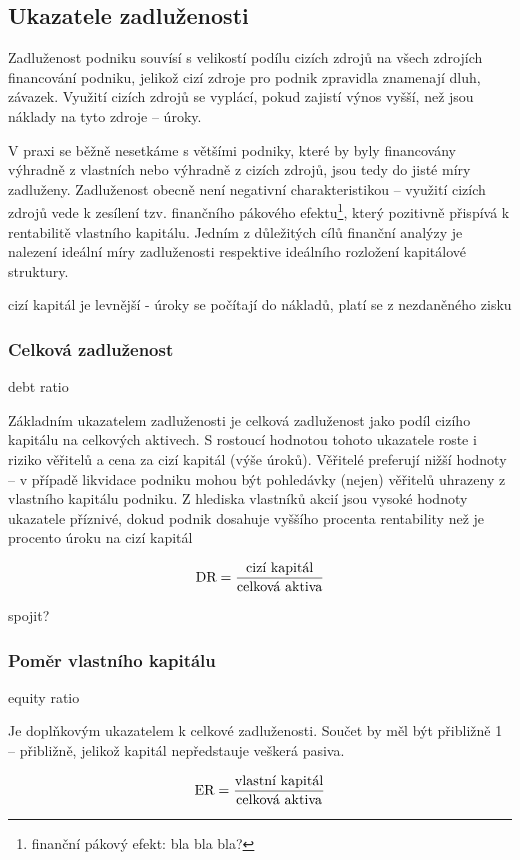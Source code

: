 \subsection{Ukazatele zadluženosti}

Zadluženost podniku souvísí s velikostí podílu cizích zdrojů na všech zdrojích financování podniku, jelikož cizí zdroje pro podnik zpravidla znamenají dluh, závazek. Využití cizích zdrojů se vyplácí, pokud zajistí výnos vyšší, než jsou náklady na tyto zdroje -- úroky. 

V praxi se běžně nesetkáme s většími podniky, které by byly financovány výhradně z vlastních nebo výhradně z cizích zdrojů, jsou tedy do jisté míry zadluženy. Zadluženost obecně není negativní charakteristikou -- využití cizích zdrojů vede k zesílení tzv. finančního pákového efektu\footnote{finanční pákový efekt: bla bla bla?}, který pozitivně přispívá k rentabilitě vlastního kapitálu\cite{kisling}. Jedním z důležitých cílů finanční analýzy je nalezení ideální míry zadluženosti respektive ideálního rozložení kapitálové struktury.

cizí kapitál je levnější - úroky se počítají do nákladů, platí se z nezdaněného zisku

\subsubsection{Celková zadluženost}
debt ratio

Základním ukazatelem zadluženosti je celková zadluženost jako podíl cizího kapitálu na celkových aktivech. S rostoucí hodnotou tohoto ukazatele roste i riziko věřitelů a cena za cizí kapitál (výše úroků). Věřitelé preferují nižší hodnoty -- v případě likvidace podniku mohou být pohledávky (nejen) věřitelů uhrazeny z vlastního kapitálu podniku.
Z hlediska vlastníků akcií jsou vysoké hodnoty ukazatele příznivé, dokud podnik dosahuje vyššího procenta rentability než je procento úroku na cizí kapitál

$$\text{DR} = \dfrac{\text{cizí kapitál}}{\text{celková aktiva}}$$

spojit?
\subsubsection{Poměr vlastního kapitálu}
equity ratio

Je doplňkovým ukazatelem k celkové zadluženosti. Součet by měl být přibližně 1 -- přibližně, jelikož kapitál nepředstauje veškerá pasiva.

$$\text{ER} = \dfrac{\text{vlastní kapitál}}{\text{celková aktiva}}$$

